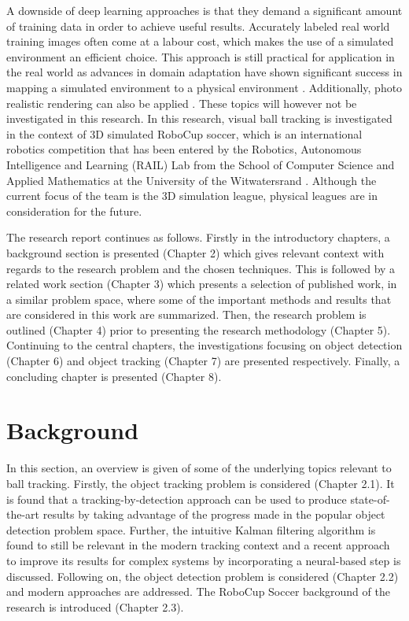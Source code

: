 \documentclass[a4paper,twoside,12pt]{report}
\begin{document}
A downside of deep learning approaches is that they demand a significant amount of training data in order to achieve useful results. Accurately labeled real world training images often come at a labour cost, which makes the use of a simulated environment an efficient choice. This approach is still practical for application in the real world as advances in domain adaptation have shown significant success in mapping a simulated environment to a physical environment \citep{domainadpt}. Additionally, photo realistic rendering can also be applied \citep{sim4cv}. These topics will however not be investigated in this research. In this research, visual ball tracking is investigated in the context of 3D simulated RoboCup soccer, which is an international robotics competition that has been entered by the Robotics, Autonomous Intelligence and Learning (RAIL) Lab from the School of Computer Science and Applied Mathematics at the University of the Witwatersrand \citep{witsfc}. Although the current focus of the team is the 3D simulation league, physical leagues are in consideration for the future. 

The research report continues as follows. Firstly in the introductory chapters, a background section is presented (Chapter 2) which gives relevant context with regards to the research problem and the chosen techniques. This is followed by a related work section (Chapter 3) which presents a selection of published work, in a similar problem space, where some of the important methods and results that are considered in this work are summarized. Then, the research problem is outlined (Chapter 4) prior to presenting the research methodology (Chapter 5). Continuing to the central chapters, the investigations focusing on object detection (Chapter 6) and object tracking (Chapter 7) are presented respectively. Finally, a concluding chapter is presented (Chapter 8).

\chapter{Background}

In this section, an overview is given of some of the underlying topics relevant to ball tracking. Firstly, the object tracking problem is considered (Chapter 2.1). It is found that a tracking-by-detection approach can be used to produce state-of-the-art results by taking advantage of the progress made in the popular object detection problem space. Further, the intuitive Kalman filtering algorithm is found to still be relevant in the modern tracking context and a recent approach to improve its results for complex systems by incorporating a neural-based step is discussed. Following on, the object detection problem is considered  (Chapter 2.2) and modern approaches are addressed. The RoboCup Soccer background of the research is introduced (Chapter 2.3).
\end{document}
